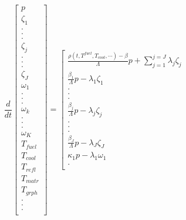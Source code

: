

\begin{equation}
  \frac{d}{dt}\left[
    \begin{array}{c}
      p\\
      \zeta_1\\
      .\\
      .\\
      .\\
      \zeta_j\\
      .\\
      .\\
      .\\
      \zeta_J\\
      \omega_1\\
      .\\
      .\\
      .\\
      \omega_k\\
      .\\
      .\\
      .\\
      \omega_K\\
      T_{fuel}\\
      T_{cool}\\
      T_{refl}\\
      T_{matr}\\
      T_{grph}\\
      .\\
      .\\
      .\\
    \end{array}
    \right]
    =
    \left[
      \begin{array}{ c }
        \frac{\rho(t,T^{fuel},T_{cool},\cdots)-\beta}{\Lambda}p +
        \displaystyle\sum^{j=J}_{j=1}\lambda_j\zeta_j\\
        \frac{\beta_1}{\Lambda} p - \lambda_1\zeta_1\\
        .\\
        .\\
        .\\
        \frac{\beta_j}{\Lambda}p-\lambda_j\zeta_j\\
        .\\
        .\\
        .\\
        \frac{\beta_J}{\Lambda}p-\lambda_J\zeta_J\\
        \kappa_1p - \lambda_1\omega_1\\
        .\\

\end{array}
\end{equation}
